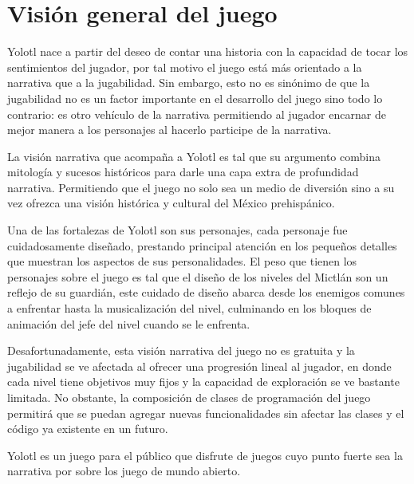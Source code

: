 \chapter{Visión general del juego}
Yolotl nace a partir del deseo de contar una historia con la capacidad de tocar los sentimientos del jugador, por tal motivo el juego está más orientado a la narrativa que a la jugabilidad. Sin embargo, esto no es sinónimo de que la jugabilidad no es un factor importante en el desarrollo del juego sino todo lo contrario: es otro vehículo de la narrativa permitiendo al jugador encarnar de mejor manera a los personajes al hacerlo participe de la narrativa.
\\
\par
La visión narrativa que acompaña a Yolotl es tal que su argumento combina mitología y sucesos históricos para darle una capa extra de profundidad narrativa. Permitiendo que el juego no solo sea un medio de diversión sino a su vez ofrezca una visión histórica y cultural del México prehispánico. 
\\
\par
 Una de las fortalezas de Yolotl son sus personajes, cada personaje fue cuidadosamente diseñado, prestando principal atención en los pequeños detalles que muestran los aspectos de sus personalidades. El peso que tienen los personajes sobre el juego es tal que el diseño de los niveles del Mictlán son un reflejo de su guardián, este cuidado de diseño abarca desde los enemigos comunes a enfrentar hasta la musicalización del nivel, culminando en los bloques de animación del jefe del nivel cuando se le enfrenta.
\\
\par
Desafortunadamente, esta visión narrativa del juego no es gratuita y la jugabilidad se ve afectada al ofrecer una progresión lineal al jugador, en donde cada nivel tiene objetivos muy fijos y la capacidad de exploración se ve bastante limitada. No obstante, la composición de clases de programación del juego permitirá que se puedan agregar nuevas funcionalidades sin afectar las clases y el código ya existente en un futuro.
\\
\par
Yolotl es un juego para el público que disfrute de juegos cuyo punto fuerte sea la narrativa por sobre los juego de mundo abierto. 
